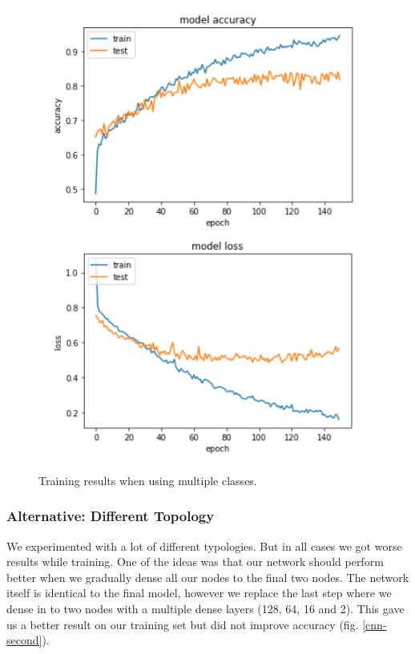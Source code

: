 \begin{figure}[ht]
\begin{center}
\centerline{\includegraphics[width=\columnwidth]{images/cnn-multi.png}}
\caption{Training results when using multiple classes.}
\label{cnn-multi}
\end{center}
\end{figure}

\subsubsection{Alternative: Different Topology}

We experimented with a lot of different typologies. But in all cases we got worse results while training. One of the ideas was that our network should perform better when we gradually dense all our nodes to the final two nodes. The network itself is identical to the final model, however we replace the last step where we dense in to two nodes with a multiple dense layers (128, 64, 16 and 2). This gave us a better result on our training set but did not improve accuracy (fig. \ref{cnn-second}).

